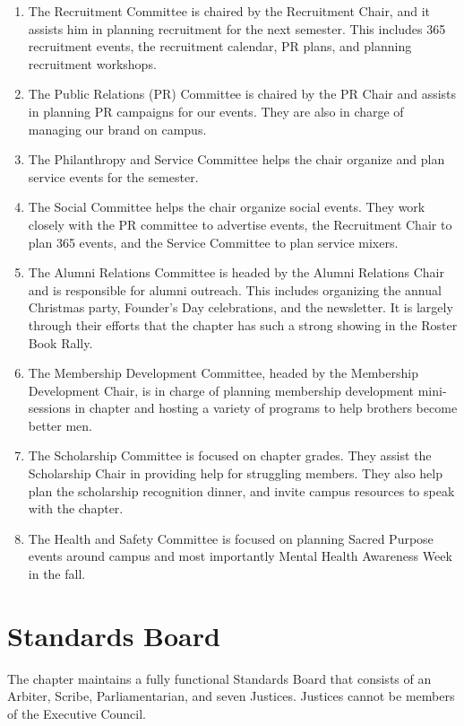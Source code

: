 	\begin{enumerate}
	  \item The Recruitment Committee is chaired by the Recruitment Chair, and it assists him in planning recruitment for the next semester. This includes 365 recruitment events, the recruitment calendar, PR plans, and planning recruitment workshops.
		
	  \item The Public Relations (PR) Committee is chaired by the PR Chair and assists in planning PR campaigns for our events. They are also in charge of managing our brand on campus. 
		
	  \item The Philanthropy and Service Committee helps the chair organize and plan service events for the semester.
		
	  \item The Social Committee helps the chair organize social events. They work closely with the PR committee to advertise events, the Recruitment Chair to plan 365 events, and the Service Committee to plan service mixers. 
		
	  \item The Alumni Relations Committee is headed by the Alumni Relations Chair and is responsible for alumni outreach. This includes organizing the annual Christmas party, Founder’s Day celebrations, and the newsletter. It is largely through their efforts that the chapter has such a strong showing in the Roster Book Rally.
		
	  \item The Membership Development Committee, headed by the Membership Development Chair, is in charge of planning membership development mini-sessions in chapter and hosting a variety of programs to help brothers become better men.
		
	  \item The Scholarship Committee is focused on chapter grades. They assist the Scholarship Chair in providing help for struggling members. They also help plan the scholarship recognition dinner, and invite campus resources to speak with the chapter.
	  
	  \item The Health and Safety Committee is focused on planning Sacred Purpose events around campus and most importantly Mental Health Awareness Week in the fall.
	\end{enumerate}
    
    \section*{Standards Board}
      The chapter maintains a fully functional Standards Board that consists of an Arbiter, Scribe, Parliamentarian, and seven Justices. Justices cannot be members of the Executive Council. \\

